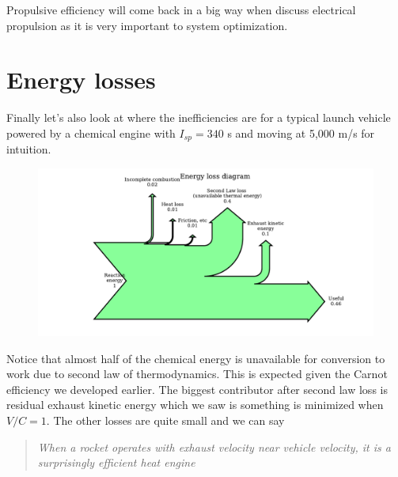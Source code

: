 \documentclass[twocolumn]{memoir} %
\begin{document}
Propulsive efficiency will come back in a big way when discuss electrical propulsion as it is very important to system optimization.

\section{Energy losses}\label{energy-losses}

Finally let's also look at where the inefficiencies are for a typical launch vehicle powered by a chemical engine with \(I_{sp} = 340\) s and moving at 5,000 m/s for intuition.

\begin{figure}[H]
    \includegraphics[width=\columnwidth]{sankey}
\end{figure}
%
Notice that almost half of the chemical energy is unavailable for conversion to work due to second law of thermodynamics.  This is expected given the Carnot efficiency we developed earlier.  The biggest contributor after second law loss is residual exhaust kinetic energy which we saw is something is minimized when $V/C = 1$.  The other losses are quite small and we can say

\begin{quote}
    \emph{When a rocket operates with exhaust velocity near vehicle velocity,
    it is a surprisingly efficient heat engine}
\end{quote}



\end{document}
